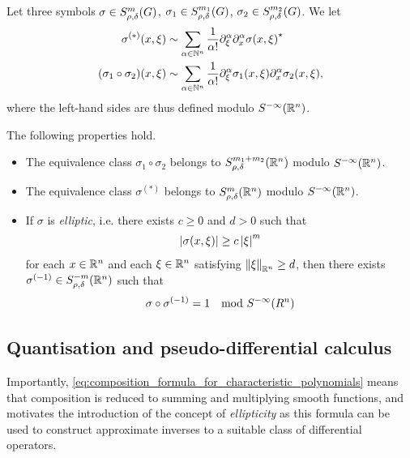 \begin{theorem}
    Let three symbols
    $\sigma \in \SymbolClass m {\rho, \delta}$,
    $\sigma_1 \in \SymbolClass {m_1} {\rho, \delta}$,
    $\sigma_2 \in \SymbolClass {m_2} {\rho, \delta}$.
    We let
    \begin{align*}
        \sigma^{(*)}(x, \xi) &\sim \sum_{\alpha \in \N^n} \frac 1 {\alpha!} \iD{\xi^\alpha} \iD{x^\alpha} \adj{\sigma(x, \xi)}\\
        (\sigma_1 \circ \sigma_2)(x, \xi) &\sim \sum_{\alpha \in \N^n} \frac 1 {\alpha!} \iD{\xi^\alpha} \sigma_1(x, \xi) \iD{x^\alpha} \sigma_2(x, \xi),
    \end{align*}
    where the left-hand sides are thus defined modulo $\SmoothingSymbols [\R^n]$.

    The following properties hold.
    \begin{itemize}
        \item The equivalence class $\sigma_1 \circ \sigma_2$ belongs to $\SymbolClass [\R^n] {m_1 + m_2} {\rho, \delta}$ modulo $\SmoothingSymbols [\R^n]$.
        \item The equivalence class $\sigma^{(*)}$ belongs to $\SymbolClass [\R^n] m {\rho, \delta}$ modulo $\SmoothingSymbols [\R^n]$.
        \item If $\sigma$ is \emph{elliptic},
            i.e. there exists $c \geq 0$ and $d > 0$ such that
            \begin{align*}
                \abs {\sigma(x, \xi)} \geq c \abs \xi^m
            \end{align*}
            for each $x \in \R^n$ and each $\xi \in \R^n$ satisfying $\norm [\R^n] \xi \geq d$,
            then there exists $\sigma^{(-1)} \in \SymbolClass [\R^n] {-m} {\rho, \delta}$ such that
            \begin{align*}
                \sigma \circ \sigma^{(-1)} = 1 \quad \text{mod } \SmoothingSymbols [R^n]
            \end{align*}
    \end{itemize}
\end{theorem}

\subsection{Quantisation and pseudo-differential calculus}

Importantly,
\eqref{eq:composition_formula_for_characteristic_polynomials} means that
composition is reduced to summing and multiplying smooth functions,
and motivates the introduction of the concept of \emph{ellipticity}
as this formula can be used to construct approximate inverses to a suitable class of differential operators.

